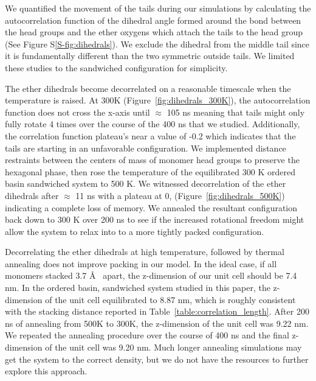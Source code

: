 \documentclass[journal=jpcbfk,manusciprt=article]{achemso}
\begin{document}
  We quantified the movement of the tails during our simulations by calculating the 
  autocorrelation function of the dihedral angle formed around the bond between the 
  head groups and the ether oxygens which attach the tails to the head group 
  (See Figure S\ref{S-fig:dihedrals}). We exclude the dihedral from the middle tail 
  since it is fundamentally different than the two symmetric outside tails. We 
  limited these studies to the sandwiched configuration for simplicity.
  
  The ether dihedrals become decorrelated on a reasonable timescale when the temperature
  is raised. At 300K (Figure~\ref{fig:dihedrals_300K}), the autocorrelation function does
  not cross the x-axis until $\approx$ 105 ns meaning that tails might only fully rotate
  4 times over the course of the 400 ns that we studied. Additionally, the correlation 
  function plateau's near a value of -0.2 which indicates that the tails are starting in 
  an unfavorable configuration. We implemented distance restraints between the centers of 
  mass of monomer head groups to preserve the hexagonal phase, then rose the temperature 
  of the equilibrated 300 K ordered basin sandwiched system to 500 K. We witnessed 
  decorrelation of the ether dihedrals after $\approx$ 11 ns with a plateau at 0, 
  (Figure~\ref{fig:dihedrals_500K}) indicating a complete loss of memory. We annealed
  the resultant configuration back down to 300 K over 200 ns to see if the increased rotational
  freedom might allow the system to relax into to a more tightly packed configuration.
  
  Decorrelating the ether dihedrals at high temperature, followed by thermal annealing
  does not improve packing in our model. In the ideal case, if all monomers stacked 
  3.7 \AA~ apart, the z-dimension of our unit cell should be 7.4 nm. In the ordered basin, 
  sandwiched system studied in this paper, the z-dimension of the unit cell equilibrated 
  to 8.87 nm, which is roughly consistent with the stacking distance reported in 
  Table~\ref{table:correlation_length}. After 200 ns of annealing from 500K to 300K, the 
  z-dimension of the unit cell was 9.22 nm. We repeated the annealing procedure over the 
  course of 400 ns and the final z-dimension of the unit cell was 9.20 nm. Much longer
  annealing simulations may get the system to the correct density, but we do not have
  the resources to further explore this approach. 
\end{document}
